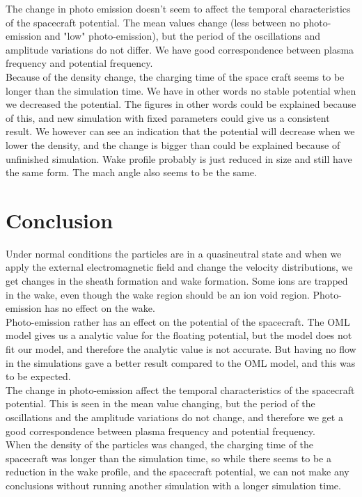 \documentclass[aip, 
rsi, 
amsmath,
amssymb,
longbibliography,
preprint]{revtex4-1}
\begin{document}
The change in photo emission doesn't seem to affect the temporal characteristics of the spacecraft potential. The mean values change (less between no photo-emission and "low" photo-emission), but the period of the oscillations and amplitude variations do not differ. We have good correspondence between plasma frequency and potential frequency.\\

Because of the density change, the charging time of the space craft seems to be longer than the simulation time. We have in other words no stable potential when we decreased the potential. The figures in other words could be explained because of this, and new simulation with fixed parameters could give us a consistent result. We however can see an indication that the potential will decrease when we lower the density, and the change is bigger than could be explained because of unfinished simulation. Wake profile probably is just reduced in size and still have the same form. The mach angle also seems to be the same. 

\section{Conclusion}
Under normal conditions the particles are in a quasineutral state and when we apply the external electromagnetic field and change the velocity distributions, we get changes in the sheath formation and wake formation. Some ions are trapped in the wake, even though the wake region should be an ion void region. Photo-emission has no effect on the wake. \\

Photo-emission rather has an effect on the potential of the spacecraft. The OML model gives us a analytic value for the floating potential, but the model does not fit our model, and therefore the analytic value is not accurate. But having no flow in the simulations gave a better result compared to the OML model, and this was to be expected. \\

The change in photo-emission affect the temporal characteristics of the spacecraft potential. This is seen in the mean value changing, but the period of the oscillations and the amplitude variations do not change, and therefore we get a good correspondence between plasma frequency and potential frequency. \\

When the density of the particles was changed, the charging time of the spacecraft was longer than the simulation time, so while there seems to be a reduction in the wake profile, and the spacecraft potential, we can not make any conclusions without running another simulation with a longer simulation time.
\end{document}
